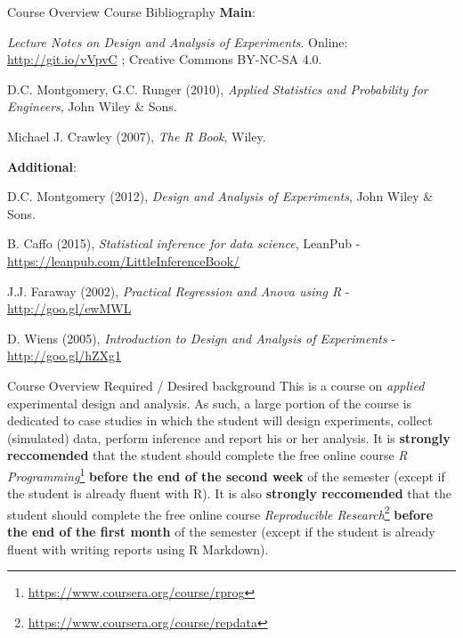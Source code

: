 \documentclass[t]{beamer}
\begin{document}
\begin{ftst}
{Course Overview}
{Course Bibliography}
\textbf{Main}:\\
{\footnotesize
\bitems \textit{Lecture Notes on Design and Analysis of Experiments}. Online: \url{http://git.io/vVpvC} ; Creative Commons BY-NC-SA 4.0.
\item D.C. Montgomery, G.C. Runger (2010), \textit{Applied Statistics and Probability for Engineers}, John Wiley \& Sons.
\item Michael J. Crawley (2007), \textit{The R Book}, Wiley.
\eitem}
\vhalf
\textbf{Additional}:
{\footnotesize
\bitems D.C. Montgomery (2012), \textit{Design and Analysis of Experiments}, John Wiley \& Sons.
\item B. Caffo (2015), \textit{Statistical inference for data science}, LeanPub - {\small\url{https://leanpub.com/LittleInferenceBook/}}
\item J.J. Faraway (2002), \textit{Practical Regression and Anova using R} - {\small\url{http://goo.gl/ewMWL}}
\item D. Wiens (2005), \textit{Introduction to Design and Analysis of Experiments} - {\small\url{http://goo.gl/hZXg1}}
\eitem}
\end{ftst}


\begin{ftst}
{Course Overview}
{Required / Desired background}
This is a course on \textit{applied} experimental design and
analysis. As such, a large portion of the course is dedicated to case
studies in which the student will design experiments, collect
(simulated) data, perform inference and report his or her analysis.
\vone
It is \textbf{strongly reccomended} that the student should complete
the free online course \textit{R
  Programming}\footnote{{\scriptsize\url{https://www.coursera.org/course/rprog}}}
\textbf{before the end of the second week} of the semester (except if
the student is already fluent with R).
\vone
It is also \textbf{strongly reccomended} that the student should
complete the free online course \textit{Reproducible
  Research}\footnote{{\scriptsize\url{https://www.coursera.org/course/repdata}}}
\textbf{before the end of the first month} of the semester (except if
the student is already fluent with writing reports using R Markdown).
\end{ftst}

\end{document}
